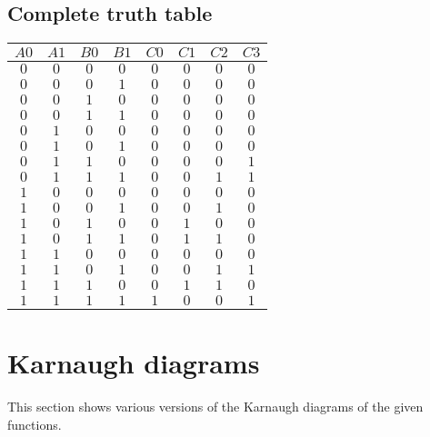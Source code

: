 \documentclass [15pt,a4paper,twoside]{article}
\begin{document}
\subsection{Complete truth table}
\begin{center}
\begin{tabular}{cccc|cccc}
$A0$&$A1$&$B0$&$B1$&$C0$&$C1$&$C2$&$C3$\\
\hline
$0$&$0$&$0$&$0$&$0$&$0$&$0$&$0$\\
$0$&$0$&$0$&$1$&$0$&$0$&$0$&$0$\\
$0$&$0$&$1$&$0$&$0$&$0$&$0$&$0$\\
$0$&$0$&$1$&$1$&$0$&$0$&$0$&$0$\\
$0$&$1$&$0$&$0$&$0$&$0$&$0$&$0$\\
$0$&$1$&$0$&$1$&$0$&$0$&$0$&$0$\\
$0$&$1$&$1$&$0$&$0$&$0$&$0$&$1$\\
$0$&$1$&$1$&$1$&$0$&$0$&$1$&$1$\\
$1$&$0$&$0$&$0$&$0$&$0$&$0$&$0$\\
$1$&$0$&$0$&$1$&$0$&$0$&$1$&$0$\\
$1$&$0$&$1$&$0$&$0$&$1$&$0$&$0$\\
$1$&$0$&$1$&$1$&$0$&$1$&$1$&$0$\\
$1$&$1$&$0$&$0$&$0$&$0$&$0$&$0$\\
$1$&$1$&$0$&$1$&$0$&$0$&$1$&$1$\\
$1$&$1$&$1$&$0$&$0$&$1$&$1$&$0$\\
$1$&$1$&$1$&$1$&$1$&$0$&$0$&$1$\\

\end{tabular}
\end{center}
\section{Karnaugh diagrams}
This section shows various versions of the Karnaugh diagrams of the given functions.
\end{document}
